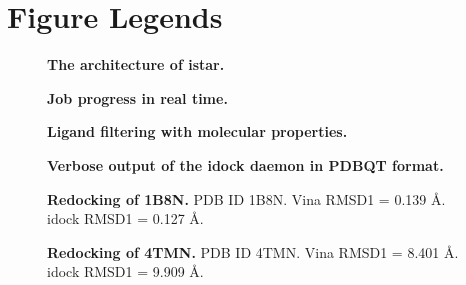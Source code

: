 \documentclass[10pt]{article}
\begin{document}
\section*{Figure Legends}

\begin{figure}[!ht]
\begin{center}
\end{center}
\caption{
{\bf The architecture of istar.}
}
\label{architecture}
\end{figure}

\begin{figure}[!ht]
\begin{center}
\end{center}
\caption{
{\bf Job progress in real time.}
}
\label{progress}
\end{figure}

\begin{figure}[!ht]
\begin{center}
\end{center}
\caption{
{\bf Ligand filtering with molecular properties.}
}
\label{slider}
\end{figure}

\begin{figure}[!ht]
\begin{center}
\end{center}
\caption{
{\bf Verbose output of the idock daemon in PDBQT format.}
}
\label{OutputPDBQT}
\end{figure}

\begin{figure}[!ht]
\begin{center}
\end{center}
\caption{
{\bf Redocking of 1B8N.} PDB ID 1B8N. Vina RMSD1 = 0.139 \AA. idock RMSD1 = 0.127 \AA.
}
\label{Redocking1B8N}
\end{figure}

\begin{figure}[!ht]
\begin{center}
\end{center}
\caption{
{\bf Redocking of 4TMN.} PDB ID 4TMN. Vina RMSD1 = 8.401 \AA. idock RMSD1 = 9.909 \AA.
}
\label{Redocking4TMN}
\end{figure}
\end{document}
